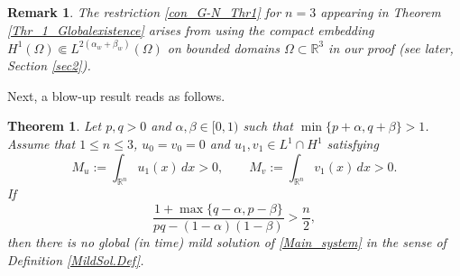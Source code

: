 \documentclass[11pt,reqno]{amsart}
\newtheorem{theorem}{Theorem}[section]
\newtheorem{remark}{Remark}[section]
\begin{document}
	\begin{remark}
		{\rm
			The restriction \eqref{con_G-N_Thr1} for $n=3$ appearing in Theorem \ref{Thr_1_Globalexistence} arises from using the compact embedding $H^1(\Omega)\Subset L^{2(\alpha_w+\beta_w)}(\Omega)$ on bounded domains $\Omega\subset\mathbb{R}^3$ in our proof (see later, Section \ref{sec2}).
		}
	\end{remark}
	Next, a blow-up result reads as follows.
	\begin{theorem}\label{Thr1_Blowup}
		Let $p,q>0$ and $\alpha,\beta\in[0,1)$ such that $\min\{p+\alpha,q+\beta\}>1$. Assume that $1\leq n\leq3$, $u_0=v_0=0$ and $u_1,v_1\in L^1\cap H^1$ satisfying
		\[
		M_u:=\int_{\mathbb{R}^n}u_1(x)\,dx>0,\qquad M_v:=\int_{\mathbb{R}^n}v_1(x)\,dx>0.
		\]
		If
		\begin{equation}\label{Thr1blowup_Criticalcurve}
			\frac{1+ \max\{q-\alpha,p-\beta\}}{pq-(1-\alpha)(1-\beta)}> \frac{n}{2},
		\end{equation}
		then there is no global (in time) mild solution of \eqref{Main_system} in the sense of Definition \ref{MildSol.Def}.
	\end{theorem}
\end{document}
